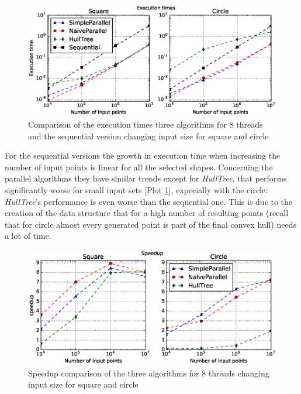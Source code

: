 \documentclass[letterpaper]{article}
\theoremstyle{definition}
\begin{document}
\begin{figure}[!ht]\centering
  \includegraphics[scale=0.33]{./plots/time_points.eps}
  \caption{Comparison of the execution times three algorithms for 8 threads and the sequential version changing input size for square and circle\label{Input size time}}
\end{figure}

For the sequential versions the growth in execution time when increasing the number of input points is linear for all the selected shapes.
Concerning the parallel algorithms they have similar trends except for \textit{HullTree}, that performs significantly worse for small input sets [Plot \ref{Input size time}], expecially with the circle: \textit{HullTree}'s performance is even worse than the sequential one.
This is due to the creation of the data structure that for a high number of resulting points (recall that for circle almost every generated point is part of the final convex hull) needs a lot of time.

\begin{figure}[!ht]\centering
  \includegraphics[scale=0.33]{./plots/speedup_points.eps}
  \caption{Speedup comparison of the three algorithms for 8 threads changing input size for square and circle\label{Input size speedup}}
\end{figure}
\end{document}
